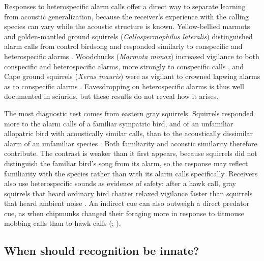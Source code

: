 Responses to heterospecific alarm calls offer a direct way to separate learning from acoustic generalization, because the receiver's experience with the calling species can vary while the acoustic structure is known.
Yellow-bellied marmots and golden-mantled ground squirrels (\textit{Callospermophilus lateralis}) distinguished alarm calls from control birdsong and responded similarly to conspecific and heterospecific alarms \citep{Shriner1998}. Woodchucks (\textit{Marmota monax}) increased vigilance to both conspecific and heterospecific alarms, more strongly to conspecific calls \citep{AschemeierMaher2011}, and Cape ground squirrels (\textit{Xerus inauris}) were as vigilant to crowned lapwing alarms as to conspecific alarms \citep{WatermanMai2020}. Eavesdropping on heterospecific alarms is thus well documented in sciurids, but these results do not reveal how it arises.

The most diagnostic test comes from eastern gray squirrels. Squirrels responded more to the alarm calls of a familiar sympatric bird, and of an unfamiliar allopatric bird with acoustically similar calls, than to the acoustically dissimilar alarm of an unfamiliar species \citep{GetschowEtAl2013}. Both familiarity and acoustic similarity therefore contribute. The contrast is weaker than it first appears, because squirrels did not distinguish the familiar bird's song from its alarm, so the response may reflect familiarity with the species rather than with its alarm calls specifically. Receivers also use heterospecific sounds as evidence of safety: after a hawk call, gray squirrels that heard ordinary bird chatter relaxed vigilance faster than squirrels that heard ambient noise \citep{LillyEtAl2019}.
An indirect cue can also outweigh a direct predator cue, as when chipmunks changed their foraging more in response to titmouse mobbing calls than to hawk calls (; \citealp{SchmidtEtAl2008}).

\subsection{When should recognition be innate?}
\label{sec:q2-function}

